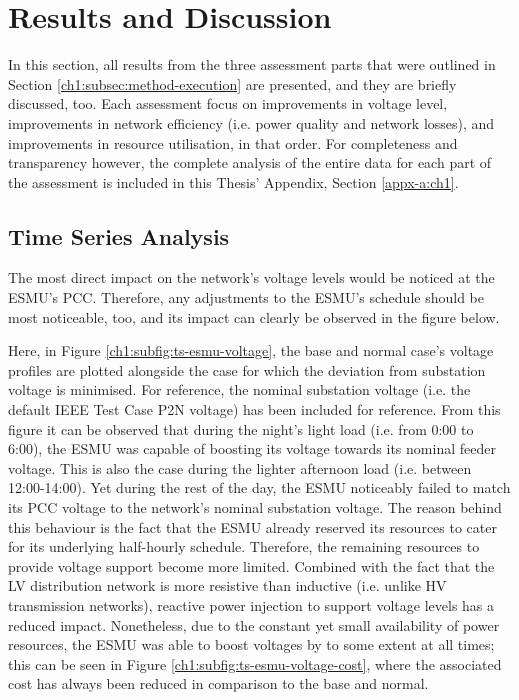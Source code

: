 \section{Results and Discussion}
\label{ch1:sec:results-and-discussion}

In this section, all results from the three assessment parts that were outlined in Section \ref{ch1:subsec:method-execution} are presented, and they are briefly discussed, too.
Each assessment focus on improvements in voltage level, improvements in network efficiency (i.e. power quality and network losses), and improvements in resource utilisation, in that order.
For completeness and transparency however, the complete analysis of the entire data for each part of the assessment is included in this Thesis' Appendix, Section \ref{appx-a:ch1}.

\subsection{Time Series Analysis}
\label{ch1:subsec:time-series-analysis}

The most direct impact on the network's voltage levels would be noticed at the ESMU's PCC.
Therefore, any adjustments to the ESMU's schedule should be most noticeable, too, and its impact can clearly be observed in the figure below.



Here, in Figure \ref{ch1:subfig:ts-esmu-voltage}, the base and normal case's voltage profiles are plotted alongside the case for which the deviation from substation voltage is minimised.
For reference, the nominal substation voltage (i.e. the default IEEE Test Case P2N voltage) has been included for reference.
From this figure it can be observed that during the night's light load (i.e. from 0:00 to 6:00), the ESMU was capable of boosting its voltage towards its nominal feeder voltage.
This is also the case during the lighter afternoon load (i.e. between 12:00-14:00).
Yet during the rest of the day, the ESMU noticeably failed to match its PCC voltage to the network's nominal substation voltage.
The reason behind this behaviour is the fact that the ESMU already reserved its resources to cater for its underlying half-hourly schedule.
Therefore, the remaining resources to provide voltage support become more limited.
Combined with the fact that the LV distribution network is more resistive than inductive (i.e. unlike HV transmission networks), reactive power injection to support voltage levels has a reduced impact.
Nonetheless, due to the constant yet small availability of power resources, the ESMU was able to boost voltages by to some extent at all times; this can be seen in Figure \ref{ch1:subfig:ts-esmu-voltage-cost}, where the associated cost has always been reduced in comparison to the base and normal.

